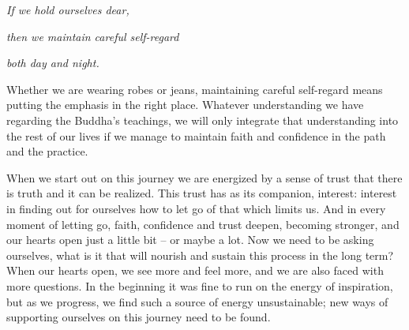 \emph{If we hold ourselves dear,}

\emph{then we maintain careful self-regard}

\emph{both day and night.}

Whether we are wearing robes or jeans, maintaining careful self-regard
means putting the emphasis in the right place. Whatever understanding we
have regarding the Buddha's teachings, we will only integrate that
understanding into the rest of our lives if we manage to maintain faith
and confidence in the path and the practice.

When we start out on this journey we are energized by a sense of trust
that there is truth and it can be realized. This trust has as its
companion, interest: interest in finding out for ourselves how to let go
of that which limits us. And in every moment of letting go, faith,
confidence and trust deepen, becoming stronger, and our hearts open just
a little bit -- or maybe a lot. Now we need to be asking ourselves, what
is it that will nourish and sustain this process in the long term? When
our hearts open, we see more and feel more, and we are also faced with
more questions. In the beginning it was fine to run on the energy of
inspiration, but as we progress, we find such a source of energy
unsustainable; new ways of supporting ourselves on this journey need to
be found.

